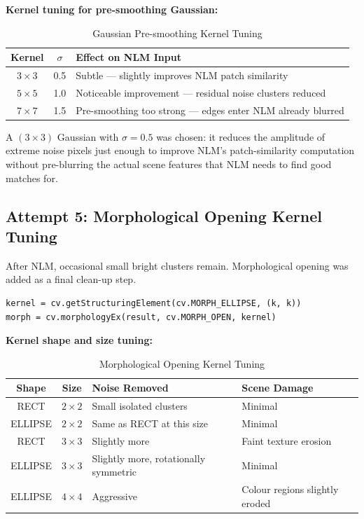 \documentclass[journal]{IEEEtran}
\begin{document}
\textbf{Kernel tuning for pre-smoothing Gaussian:}

\begin{table}[h]
\centering
\caption{Gaussian Pre-smoothing Kernel Tuning}
\begin{tabular}{@{}ccl@{}}
\toprule
Kernel & $\sigma$ & Effect on NLM Input \\
\midrule
$3\times3$ & 0.5 & Subtle — slightly improves NLM patch similarity \\
$5\times5$ & 1.0 & Noticeable improvement — residual noise clusters reduced \\
$7\times7$ & 1.5 & Pre-smoothing too strong — edges enter NLM already blurred \\
\bottomrule
\end{tabular}
\end{table}

A $(3\times3)$ Gaussian with $\sigma=0.5$ was chosen: it reduces the amplitude of 
extreme noise pixels just enough to improve NLM's patch-similarity computation 
without pre-blurring the actual scene features that NLM needs to find good matches for.

\subsection{Attempt 5: Morphological Opening Kernel Tuning}
After NLM, occasional small bright clusters remain. Morphological opening was added 
as a final clean-up step.

\begin{lstlisting}
kernel = cv.getStructuringElement(cv.MORPH_ELLIPSE, (k, k))
morph = cv.morphologyEx(result, cv.MORPH_OPEN, kernel)
\end{lstlisting}

\textbf{Kernel shape and size tuning:}

\begin{table}[h]
\centering
\caption{Morphological Opening Kernel Tuning}
\begin{tabular}{@{}ccll@{}}
\toprule
Shape & Size & Noise Removed & Scene Damage \\
\midrule
RECT & $2\times2$ & Small isolated clusters & Minimal \\
ELLIPSE & $2\times2$ & Same as RECT at this size & Minimal \\
RECT & $3\times3$ & Slightly more & Faint texture erosion \\
ELLIPSE & $3\times3$ & Slightly more, rotationally symmetric & Minimal \\
ELLIPSE & $4\times4$ & Aggressive & Colour regions slightly eroded \\
\bottomrule
\end{tabular}
\end{table}
\end{document}
